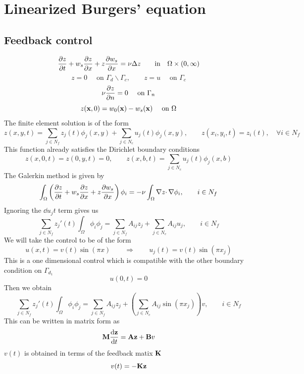 \documentclass[12pt]{article}
\begin{document}

\section{Linearized Burgers' equation}

\subsection{Feedback control}
\begin{equation*}
\frac{\partial z}{\partial t} + w_s \frac{\partial z}{\partial x} + z \frac{\partial w_s}{\partial x} = \nu \Delta z \qquad \mbox{in} \quad \Omega \times (0,\infty)
\end{equation*}
\begin{equation*}
z = 0 \quad \text{ on } \Gamma_d \backslash \Gamma_c, \qquad z = u \quad \text{ on } \Gamma_c
\end{equation*}
\begin{equation*}
\nu \frac{\partial z}{\partial n} = 0 \quad \text{ on } \Gamma_n 
\end{equation*}
\begin{equation*}
z({\mathbf x},0) = w_0({\mathbf x}) - w_s({\mathbf x}) \quad \text{ on } \Omega
\end{equation*}
The finite element solution is of the form
\[
z(x,y,t) = \sum_{j \in N_f} z_j(t) \phi_j(x,y) + \sum_{j \in N_c} u_j(t) \phi_j(x,y), \qquad z(x_i,y_i,t) = z_i(t), \quad \forall i \in N_f
\]
This function already satisfies the Dirichlet boundary conditions
\[
z(x,0,t) = z(0,y,t) = 0, \qquad z(x,b,t) = \sum_{j \in N_c} u_j(t) \phi_j(x,b)
\]
The Galerkin method is given by
\begin{equation*}
\int_\Omega \left( \frac{\partial z}{\partial t} + w_s \frac{\partial z}{\partial x} + z \frac{\partial w_s}{\partial x} \right) \phi_i = - \nu \int_\Omega \nabla z \cdotp \nabla \phi_i , \qquad i \in N_f
\end{equation*}
Ignoring the $\dd{u_j}{t}$ term gives us
\[
\sum_{j \in N_f} z_j'(t) \int_\Omega \phi_i \phi_j = \sum_{j \in N_f} A_{ij} z_j + \sum_{j \in N_c} A_{ij} u_j, \qquad i \in N_f
\]
We will take the control to be of the form
\[
u(x,t) = v(t) \sin(\pi x) \qquad \Longrightarrow \qquad u_j(t) = v(t) \sin(\pi x_j)
\]
This is a one dimensional control which is compatible with the other boundary condition on $\Gamma_{d_1}$
\[
u(0,t) = 0
\]
Then we obtain
\[
\sum_{j \in N_f} z_j'(t) \int_\Omega \phi_i \phi_j = \sum_{j \in N_f} A_{ij} z_j + \left(\sum_{j \in N_c} A_{ij} \sin(\pi x_j) \right) v, \qquad i \in N_f
\]
This can be written in matrix form as
\[
{\mathbf M} \frac{\textrm{d} {\mathbf z}}{\textrm{d} t} = {\mathbf A} {\mathbf z} + {\mathbf B} v
\]
$v(t)$ is obtained in terms of the feedback matix ${\mathbf K}$ 
\[
 v(t) = - {\mathbf K} {\mathbf z}
\]
\end{document}
